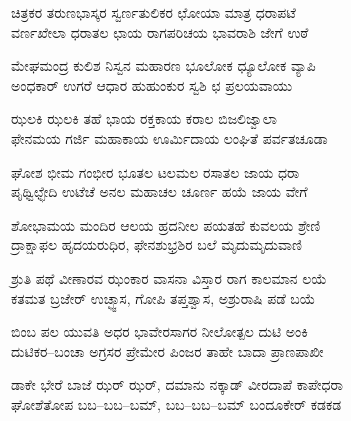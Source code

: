 
\begin{myquote}
ಚಿತ್ರಕರ ತರುಣಭಾಸ್ಕರ ಸ್ವರ್ಣತುಲಿಕರ ಛೋಯಾ ಮಾತ್ರ ಧರಾಪಟೆ\\ವರ್ಣಖೇಲಾ ಧರಾತಲ ಛಾಯ ರಾಗಪರಿಚಯ ಭಾವರಾಶಿ ಜೇಗೆ ಉಠೆ
\end{myquote}


\begin{myquote}
ಮೇಘಮಂದ್ರ ಕುಲಿಶ ನಿಸ್ವನ ಮಹಾರಣ ಭೂಲೋಕ ಧ್ಯೂಲೋಕ ವ್ಯಾಪಿ\\ಅಂಧಕಾರ್ ಉಗರೆ ಆಧಾರ ಹುಹುಂಕುರ ಸ್ವಶಿ ಛ ಪ್ರಲಯವಾಯು
\end{myquote}


\begin{myquote}
ಝಲಕಿ ಝಲಕಿ ತಹೆ ಭಾಯ ರಕ್ತಕಾಯ ಕರಾಲ ಬಿಜಲಿಜ್ವಾಲಾ\\ಫೇನಮಯ ಗರ್ಜಿ ಮಹಾಕಾಯ ಊರ್ಮಿದಾಯ ಲಂಘಿತೆ ಪರ್ವತಚೂಡಾ
\end{myquote}


\begin{myquote}
ಘೋಶ ಭೀಮ ಗಂಭೀರ ಭೂತಲ ಟಲಮಲ ರಸಾತಲ ಜಾಯ ಧರಾ\\ಪೃಥ್ವಿಛ್ಛೇದಿ ಉಟೆಚೆ ಅನಲ ಮಹಾಚಲ ಚೂರ್ಣ ಹಯೆ ಜಾಯ ವೇಗೆ
\end{myquote}


\begin{myquote}
ಶೋಭಾಮಯ ಮಂದಿರ ಆಲಯ ಹ್ರದನೀಲ ಪಯತಹೆ ಕುವಲಯ ಶ್ರೇಣಿ\\ದ್ರಾಕ್ಷಾಫಲ ಹೃದಯರುಧಿರ, ಫೇನಶುಭ್ರಶಿರ ಬಲೆ ಮೃದುಮೃದುವಾಣಿ
\end{myquote}


\begin{myquote}
ಶ್ರುತಿ ಪಥೆ ವೀಣಾರವ ಝಂಕಾರ ವಾಸನಾ ವಿಸ್ತಾರ ರಾಗ ಕಾಲಮಾನ ಲಯೆ\\ಕತಮತ ಬ್ರಜೇರ್‌ ಉಚ್ಛ್ವಾಸ, ಗೋಪಿ ತಪ್ತಶ್ವಾಸ, ಅಶ್ರುರಾಷಿ ಪಡೆ ಬಯೆ
\end{myquote}


\begin{myquote}
ಬಿಂಬ ಪಲ ಯುವತಿ ಅಧರ ಭಾವೇರಸಾಗರ ನೀಲೋತ್ಪಲ ದುಟಿ ಅಂಕಿ\\ದುಟಿಕರ–ಬಂಚಾ ಅಗ್ರಸರ ಪ್ರೇಮೇರ ಪಿಂಜರ ತಾಹೇ ಬಾದಾ ಪ್ರಾಣಪಾಖೀ
\end{myquote}


\begin{myquote}
ಡಾಕೇ ಭೇರೆ ಬಾಜೆ ಝರ್ ಝರ್, ದಮಾನು ನಕ್ಕಾಡ್ ವೀರದಾಪೆ ಕಾಪೇಧರಾ\\ಘೋಶೆತೋಪ ಬಬ–ಬಬ–ಬಮ್, ಬಬ–ಬಬ–ಬಮ್ ಬಂದೂಕೇರ್ ಕಡಕಡ
\end{myquote}

